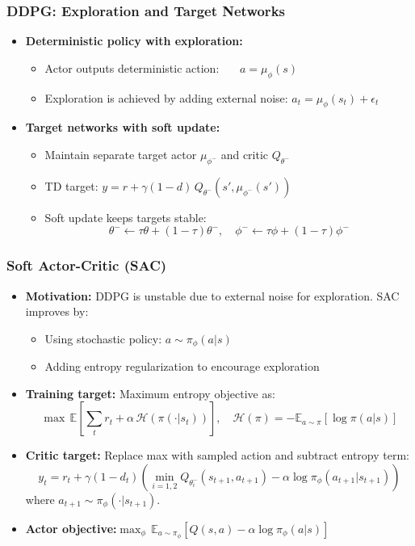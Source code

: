 \documentclass[11pt,aspectratio=169,xcolor={dvipsnames},usepdftitle=false]{beamer}
\begin{document}
\begin{frame}
\frametitle{DDPG: Exploration and Target Networks}
\begin{itemize}

	\item \textbf{Deterministic policy with exploration:}
	\begin{itemize}
		\item Actor outputs deterministic action: \qquad \qquad \quad \ \ \ $a = \mu_\phi(s)$
		\item Exploration is achieved by adding external noise: $a_t = \mu_\phi(s_t) + \epsilon_t$
	\end{itemize}

	\item \textbf{Target networks with soft update:}
	\begin{itemize}
		\item Maintain separate target actor $\mu_{\phi^-}$ and critic $Q_{\theta^-}$
		\item TD target: $y = r + \gamma (1-d)\, Q_{\theta^-}(s', \mu_{\phi^-}(s'))$
		\item Soft update keeps targets stable:
		$$
		\theta^- \leftarrow \tau \theta + (1-\tau)\theta^-, \quad \phi^- \leftarrow \tau \phi + (1-\tau)\phi^-
		$$
	\end{itemize}

\end{itemize}
\end{frame}


\begin{frame}
\frametitle{Soft Actor-Critic (SAC)}
\begin{itemize}
\item \textbf{Motivation:}
DDPG is unstable due to external noise for exploration.
SAC improves by:
\begin{itemize}
\item Using stochastic policy: $a\sim\pi_\phi(a|s)$
\item Adding entropy regularization to encourage exploration
\end{itemize}

\item \textbf{Training target:} Maximum entropy objective as:
$$
\max\,\mathbb{E}\left[\sum_t r_t + \alpha\,\mathcal{H}(\pi(\cdot|s_t))\right], \quad \mathcal{H}(\pi) = -\mathbb{E}_{a\sim\pi}[\log\pi(a|s)]
$$

\item \textbf{Critic target:}
Replace max with sampled action and subtract entropy term:
\vspace{-1.0em}
$$
y_t = r_t + \gamma(1-d_t)\left(\min_{i=1,2}Q_{\theta_i^-}(s_{t+1},a_{t+1}) - \alpha\log\pi_\phi(a_{t+1}|s_{t+1})\right)
$$
where $a_{t+1}\sim\pi_\phi(\cdot|s_{t+1})$.

\item \textbf{Actor objective:}\hfill $\max_\phi\,\mathbb{E}_{a\sim\pi_\phi}[Q(s,a)-\alpha\log\pi_\phi(a|s)]$\hfill\null

\end{itemize}
\end{frame}
\end{document}
